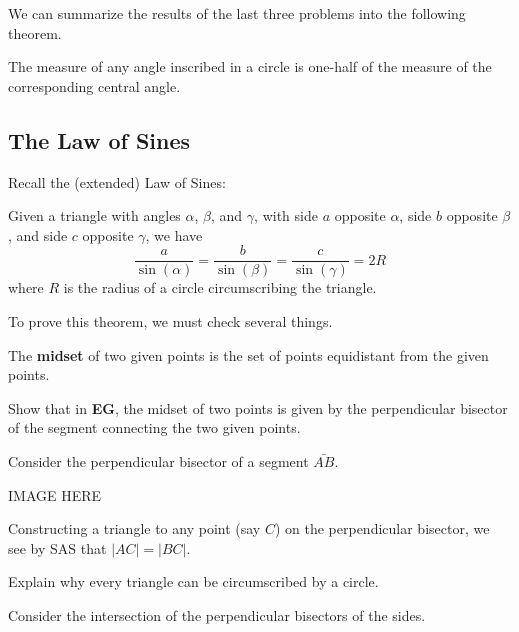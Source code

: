 \documentclass[newpage,hints,handout,noauthor,nooutcomes,12pt]{ximera}
\begin{document}
We can summarize the results of the last three problems into the following theorem.

\begin{theorem}
\label{43}The measure of any angle inscribed in a circle is one-half of the
measure of the corresponding central angle.
\end{theorem}




\subsection{The Law of Sines}


Recall the (extended) Law of Sines:

\begin{theorem}
Given a triangle with angles $\alpha$, $\beta$, and $\gamma$, with
side $a$ opposite $\alpha$, side $b$ opposite $\beta$, and side $c$
opposite $\gamma$, we have
\[
\frac{a}{\sin(\alpha)} = \frac{b}{\sin(\beta)} = \frac{c}{\sin(\gamma)} = 2R  
\]
where $R$ is the radius of a circle circumscribing the triangle.
\end{theorem}

To prove this theorem, we must check several things. 

\begin{definition}
The \textbf{midset} of two given points is the set of points
equidistant from the given points.
\end{definition}

\begin{problem}
Show that in \textbf{EG}, the midset of two points is given by the
perpendicular bisector of the segment connecting the two given points.
\begin{freeResponse}
Consider the perpendicular bisector of a segment $\bar{AB}$.
\begin{image}
IMAGE HERE
\end{image}
Constructing a triangle to any point (say $C$) on the perpendicular
bisector, we see by SAS that $|AC|=|BC|$.
\end{freeResponse}
\end{problem}


\begin{problem}
Explain why every triangle can be circumscribed by a circle.
\begin{hint}
Consider the intersection of the perpendicular bisectors of the sides.
\end{hint}
\end{problem}
\end{document}
